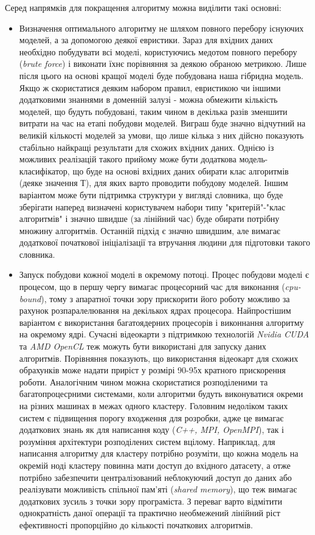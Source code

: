 Серед напрямків для покращення алгоритму можна виділити такі основні:

\begin{itemize}
	\item Визначення оптимального алгоритму не шляхом повного перебору існуючих моделей, а за допомогою деякої евристики. Зараз для вхідних даних необхідно побудувати всі моделі, користуючись медотом повного перебору (\textit{brute force}) і виконати їхнє порівняння за деякою обраною метрикою. Лише після цього на основі кращої моделі буде побудована наша гібридна модель. Якщо ж скористатися деяким набором правил, евристикою чи іншими додатковими знаннями в доменній залузі - можна обмежити кількість моделей, що будуть побудовані, таким чином в декілька разів зменшити витрати на час на етапі побудови моделей. Виграш буде значно відчутний на великій кількості моделей за умови, що лише кілька з них дійсно показують стабільно найкращі результати для схожих вхідних даних. Однією із можливих реалізацій такого прийому може бути додаткова модель-класифікатор, що буде на основі вхідних даних обирати клас алгоритмів (деяке значення Т), для яких варто проводити побудову моделей. Іншим варіантом може бути підтримка структури у вигляді словника, що буде зберігати наперед визначені користувачем набори типу "критерій"-"клас алгоритмів" і значно швидше (за лінійний час) буде обирати потрібну множину алгоритмів. Останній підхід є значно швидшим, але вимагає додаткової початкової ініціалізації та втручання людини для підготовки такого словника.
	\item Запуск побудови кожної моделі в окремому потоці. Процес побудови моделі є процесом, що в першу чергу вимагає процесорний час для виконання (\textit{cpu-bound}), тому з апаратної точки зору прискорити його роботу можливо за рахунок розпаралелювання на декількох ядрах процесора. Найпростішим варіантом є використання багатоядерних процесорів і виконнання алгоритму на окремому ядрі. Сучасні відеокарти з підтримкою технологій \textit{Nvidia CUDA} та \textit{AMD OpenCL} теж можуть бути використані для запуску даних алгоритмів. Порівняння показують, що використання відеокарт для схожих обрахунків може надати приріст у розмірі 90-95х кратного прискорення роботи. Аналогічним чином можна скористатися розподіленими та багатопроцесрними системами, коли алгоритми будуть виконуватися окреми на різних машинах в межах одного кластеру. Головним недоліком таких систем є підвищення порогу входження для розробки, адже це вимагає додаткових знань як для написання коду (\textit{C++, MPI, OpenMPI}), так і розуміння архітектури розподілених систем вцілому. Наприклад, для написання алгоритму для кластеру потрібно розуміти, що кожна модель на окремій ноді кластеру повинна мати доступ до вхідного датасету, а отже потрібно забезпечити централізований неблокуючий доступ до даних або реалізувати можливість спільної пам'яті (\textit{shared memory}), що теж вимагає додаткових зусиль з точки зору програміста. З переваг варто відмітити однократність даної операції та практично необмежений лінійний ріст ефективності пропорційно до кількості початкових алгоритмів.

\end{itemize}
